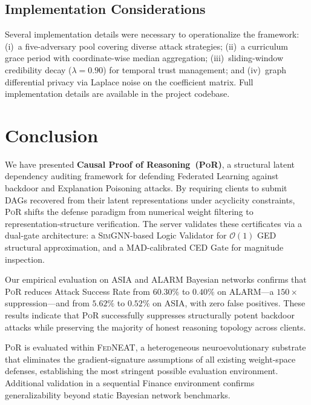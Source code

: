 \documentclass[journal]{IEEEtran}
\newcommand{\por}{\textsc{PoR}}
\newcommand{\fedneat}{\textsc{FedNEAT}}
\newcommand{\simgnn}{\textsc{SimGNN}}
\begin{document}
\subsection{Implementation Considerations}
\label{sec:engineering}

Several implementation details were necessary to operationalize the
framework: (i)~a five-adversary pool covering diverse attack strategies;
(ii)~a curriculum grace period with coordinate-wise median aggregation;
(iii)~sliding-window credibility decay ($\lambda=0.90$) for temporal
trust management; and (iv)~graph differential privacy via Laplace noise
on the coefficient matrix. Full implementation details are available in
the project codebase.

\section{Conclusion}
\label{sec:conclusion}

We have presented \textbf{Causal Proof of Reasoning~(\por{})}, a structural
latent dependency auditing framework for defending Federated Learning against
backdoor and Explanation Poisoning attacks. By requiring clients to submit
DAGs recovered from their latent representations under acyclicity constraints,
\por{} shifts the defense paradigm from numerical weight filtering to
representation-structure verification. The server validates these certificates
via a dual-gate architecture: a \simgnn{}-based Logic Validator for
$\mathcal{O}(1)$ GED structural approximation, and a MAD-calibrated CED Gate
for magnitude inspection.

Our empirical evaluation on ASIA and ALARM Bayesian networks confirms
that \por{} reduces Attack Success Rate from $60.30\%$ to $0.40\%$ on
ALARM---a $150\times$ suppression---and from $5.62\%$ to $0.52\%$ on ASIA,
with zero false positives. These results indicate that \por{} successfully
suppresses structurally potent backdoor attacks while preserving the majority
of honest reasoning topology across clients.

\por{} is evaluated within \fedneat{}, a heterogeneous neuroevolutionary
substrate that eliminates the gradient-signature assumptions of all existing
weight-space defenses, establishing the most stringent possible evaluation
environment. Additional validation in a sequential Finance environment confirms
generalizability beyond static Bayesian network benchmarks.
\end{document}
